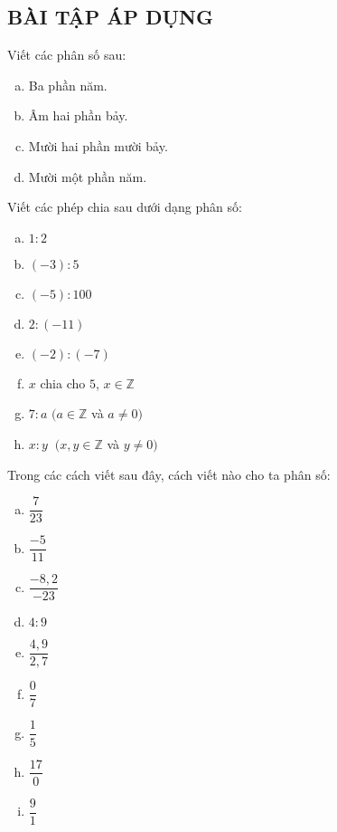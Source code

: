 \subsection{BÀI TẬP ÁP DỤNG}
\begin{bt}
Viết các phân số sau:
\begin{enumerate}[a)]
\item Ba phần năm.
\item Âm hai phần bảy.
\item Mười hai phần mười bảy.
\item Mười một phần năm.
\end{enumerate}	 

\end{bt}   \begin{bt}
Viết các phép chia sau dưới dạng phân số:
\begin{enumerate}[a)]
\item $1:2$
\item $(-3):5$
\item $(-5):100$
\item $2:(-11)$
\item $(-2):(-7)$
\item $x$ chia cho $5$, \; $x \in \mathbb{Z}$
\item $7:a$ \;\; $(a\in \mathbb{Z}$ và $a \neq 0)$
\item $x:y \;\; (x,y \in \mathbb{Z}$ và $y \neq 0)$
\end{enumerate}

\end{bt}   \begin{bt}
Trong các cách viết sau đây, cách viết nào cho ta phân số:
\begin{multicols}{2}
\begin{enumerate}[a)]
\item $\dfrac{7}{23}$
\item $\dfrac{-5}{11}$
\item $\dfrac{-8,2}{-23}$
\item $4:9$
\item $\dfrac{4,9}{2,7}$
\item $\dfrac{0}{7}$
\item $\dfrac{1}{5}$
\item $\dfrac{17}{0}$
\item $\dfrac{9}{1}$
\end{enumerate}
\end{multicols}


\end{bt}
